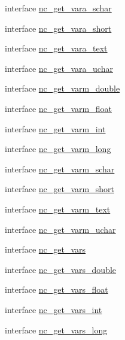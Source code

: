 \begin{DoxyCompactItemize}
\item 
interface \hyperlink{interfacenetcdf__nc__interfaces_1_1nc__get__vara__schar}{nc\+\_\+get\+\_\+vara\+\_\+schar}
\item 
interface \hyperlink{interfacenetcdf__nc__interfaces_1_1nc__get__vara__short}{nc\+\_\+get\+\_\+vara\+\_\+short}
\item 
interface \hyperlink{interfacenetcdf__nc__interfaces_1_1nc__get__vara__text}{nc\+\_\+get\+\_\+vara\+\_\+text}
\item 
interface \hyperlink{interfacenetcdf__nc__interfaces_1_1nc__get__vara__uchar}{nc\+\_\+get\+\_\+vara\+\_\+uchar}
\item 
interface \hyperlink{interfacenetcdf__nc__interfaces_1_1nc__get__varm__double}{nc\+\_\+get\+\_\+varm\+\_\+double}
\item 
interface \hyperlink{interfacenetcdf__nc__interfaces_1_1nc__get__varm__float}{nc\+\_\+get\+\_\+varm\+\_\+float}
\item 
interface \hyperlink{interfacenetcdf__nc__interfaces_1_1nc__get__varm__int}{nc\+\_\+get\+\_\+varm\+\_\+int}
\item 
interface \hyperlink{interfacenetcdf__nc__interfaces_1_1nc__get__varm__long}{nc\+\_\+get\+\_\+varm\+\_\+long}
\item 
interface \hyperlink{interfacenetcdf__nc__interfaces_1_1nc__get__varm__schar}{nc\+\_\+get\+\_\+varm\+\_\+schar}
\item 
interface \hyperlink{interfacenetcdf__nc__interfaces_1_1nc__get__varm__short}{nc\+\_\+get\+\_\+varm\+\_\+short}
\item 
interface \hyperlink{interfacenetcdf__nc__interfaces_1_1nc__get__varm__text}{nc\+\_\+get\+\_\+varm\+\_\+text}
\item 
interface \hyperlink{interfacenetcdf__nc__interfaces_1_1nc__get__varm__uchar}{nc\+\_\+get\+\_\+varm\+\_\+uchar}
\item 
interface \hyperlink{interfacenetcdf__nc__interfaces_1_1nc__get__vars}{nc\+\_\+get\+\_\+vars}
\item 
interface \hyperlink{interfacenetcdf__nc__interfaces_1_1nc__get__vars__double}{nc\+\_\+get\+\_\+vars\+\_\+double}
\item 
interface \hyperlink{interfacenetcdf__nc__interfaces_1_1nc__get__vars__float}{nc\+\_\+get\+\_\+vars\+\_\+float}
\item 
interface \hyperlink{interfacenetcdf__nc__interfaces_1_1nc__get__vars__int}{nc\+\_\+get\+\_\+vars\+\_\+int}
\item 
interface \hyperlink{interfacenetcdf__nc__interfaces_1_1nc__get__vars__long}{nc\+\_\+get\+\_\+vars\+\_\+long}

\end{DoxyCompactItemize}
